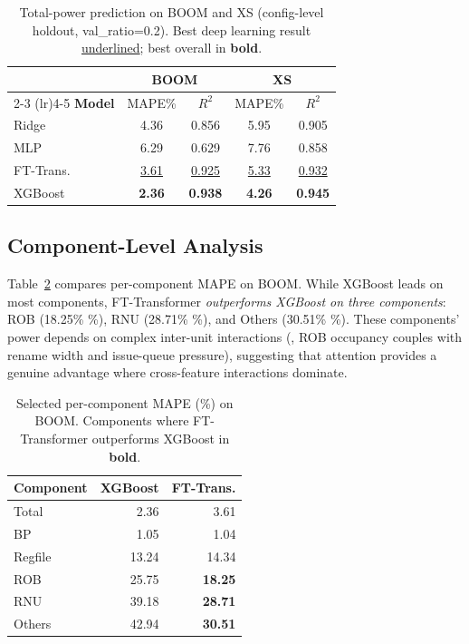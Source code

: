 \documentclass[10pt,twocolumn,letterpaper]{article}
\begin{document}
\begin{table}[t]
\centering
\small
\caption{Total-power prediction on BOOM and XS (config-level holdout,
val\_ratio=0.2).  Best deep learning result \underline{underlined};
best overall in \textbf{bold}.}
\label{tab:results}
\begin{tabular}{l cc cc}
\toprule
& \multicolumn{2}{c}{\textbf{BOOM}} & \multicolumn{2}{c}{\textbf{XS}} \\
\cmidrule(lr){2-3} \cmidrule(lr){4-5}
\textbf{Model} & MAPE\% & $R^2$ & MAPE\% & $R^2$ \\
\midrule
Ridge        & 4.36 & 0.856 & 5.95 & 0.905 \\
MLP          & 6.29 & 0.629 & 7.76 & 0.858 \\
\midrule
FT-Trans.    & \underline{3.61} & \underline{0.925} & \underline{5.33} & \underline{0.932} \\
XGBoost      & \textbf{2.36} & \textbf{0.938} & \textbf{4.26} & \textbf{0.945} \\
\bottomrule
\end{tabular}
\end{table}

\subsection{Component-Level Analysis}

Table~\ref{tab:component} compares per-component MAPE on BOOM.  While
XGBoost leads on most components, FT-Transformer \emph{outperforms XGBoost
on three components}: ROB (18.25\% \%), RNU (28.71\% \%), and Others (30.51\% \%).  These components' power
depends on complex inter-unit interactions (\eg, ROB occupancy couples
with rename width and issue-queue pressure), suggesting that attention
provides a genuine advantage where cross-feature interactions dominate.

\begin{table}[t]
\centering
\small
\caption{Selected per-component MAPE (\%) on BOOM.  Components where
FT-Transformer outperforms XGBoost in \textbf{bold}.}
\label{tab:component}
\begin{tabular}{l rr}
\toprule
\textbf{Component} & \textbf{XGBoost} & \textbf{FT-Trans.} \\
\midrule
Total    &  2.36 &  3.61 \\
BP       &  1.05 &  1.04 \\
Regfile  & 13.24 & 14.34 \\
ROB      & 25.75 & \textbf{18.25} \\
RNU      & 39.18 & \textbf{28.71} \\
Others   & 42.94 & \textbf{30.51} \\
\bottomrule
\end{tabular}
\end{table}
\end{document}
